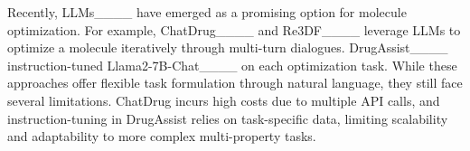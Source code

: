 
Recently, LLMs____ have emerged as a promising option for molecule optimization. 
%
For example,
ChatDrug____ and Re3DF____ leverage 
LLMs to optimize a molecule iteratively
through multi-turn dialogues.
%
DrugAssist____
instruction-tuned Llama2-7B-Chat____ 
on each optimization task. 
%
While these approaches offer flexible 
task formulation through natural language, they still face
several limitations.
%
ChatDrug incurs high costs due to multiple API calls, 
and
instruction-tuning in DrugAssist relies on task-specific data,
limiting scalability and adaptability to more complex multi-property tasks.
%
%
%

%

%
%

